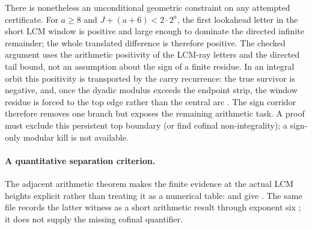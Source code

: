 \documentclass[11pt]{article}
\begin{document}
There is nonetheless an unconditional geometric constraint on any attempted
certificate.  For $a\ge8$ and
$J+(a+6)<2\cdot2^a$, the first lookahead letter in the short LCM window is
positive and large enough to dominate the directed infinite remainder; the
whole translated difference is therefore positive.  The checked argument
uses the arithmetic positivity of the LCM-ray letters and the directed tail
bound, not an assumption about the sign of a finite residue.  In an integral
orbit this positivity is transported by the carry recurrence: the true
survivor is negative, and, once the dyadic modulus exceeds the endpoint strip,
the window residue is forced to the top edge rather than the central arc
.
The sign corridor therefore removes one branch but exposes the remaining
arithmetic task.  A proof must exclude this persistent top boundary (or find
cofinal non-integrality); a sign-only modular kill is not available.

\paragraph{A quantitative separation criterion.}
The adjacent arithmetic theorem makes the finite evidence at the actual
LCM heights explicit rather than treating it as a numerical table:
and
give
.
The same file records the latter witness as a short arithmetic result
through exponent six
; it does not supply the missing cofinal quantifier.
\end{document}

